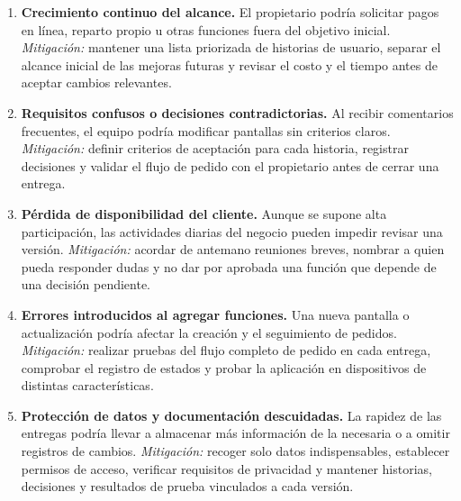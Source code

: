 \begin{enumerate}
  \item \textbf{Crecimiento continuo del alcance.} El propietario podría
  solicitar pagos en línea, reparto propio u otras funciones fuera del
  objetivo inicial. \emph{Mitigación:} mantener una lista priorizada de
  historias de usuario, separar el alcance inicial de las mejoras futuras
  y revisar el costo y el tiempo antes de aceptar cambios relevantes.

  \item \textbf{Requisitos confusos o decisiones contradictorias.}
  Al recibir comentarios frecuentes, el equipo podría modificar pantallas
  sin criterios claros. \emph{Mitigación:} definir criterios de aceptación
  para cada historia, registrar decisiones y validar el flujo de pedido con
  el propietario antes de cerrar una entrega.

  \item \textbf{Pérdida de disponibilidad del cliente.} Aunque se supone
  alta participación, las actividades diarias del negocio pueden impedir
  revisar una versión. \emph{Mitigación:} acordar de antemano reuniones
  breves, nombrar a quien pueda responder dudas y no dar por aprobada una
  función que depende de una decisión pendiente.

  \item \textbf{Errores introducidos al agregar funciones.} Una nueva
  pantalla o actualización podría afectar la creación y el seguimiento de
  pedidos. \emph{Mitigación:} realizar pruebas del flujo completo de pedido
  en cada entrega, comprobar el registro de estados y probar la aplicación
  en dispositivos de distintas características.

  \item \textbf{Protección de datos y documentación descuidadas.} La
  rapidez de las entregas podría llevar a almacenar más información de la
  necesaria o a omitir registros de cambios. \emph{Mitigación:} recoger
  solo datos indispensables, establecer permisos de acceso, verificar
  requisitos de privacidad y mantener historias, decisiones y resultados
  de prueba vinculados a cada versión.
\end{enumerate}
